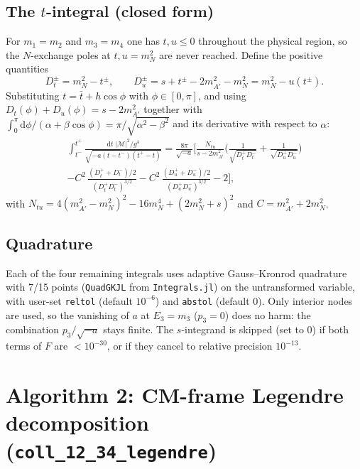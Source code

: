 \documentclass[11pt,a4paper]{article}
\newcommand{\dd}{\mathrm{d}}
\newcommand{\Msq}{|\mathcal{M}|^2}
\newcommand{\code}[1]{\texttt{#1}}
\begin{document}
\subsection{The $t$-integral (closed form)}

For $m_1=m_2$ and $m_3=m_4$ one has $t,u\le0$ throughout the physical region,
so the $N$-exchange poles at $t,u=m_N^2$ are never reached. Define the
positive quantities
\begin{equation}
  D_t^\pm = m_N^2-t^\pm,\qquad D_u^\pm = s+t^\pm-2m_{A'}^2-m_N^2 = m_N^2-u(t^\pm).
\end{equation}
Substituting $t=\bar t+h\cos\phi$ with $\phi\in[0,\pi]$, and using
$D_t(\phi)+D_u(\phi)=s-2m_{A'}^2$ together with
$\int_0^\pi\dd\phi/(\alpha+\beta\cos\phi)=\pi/\sqrt{\alpha^2-\beta^2}$ and its
derivative with respect to $\alpha$:
\begin{multline}
  \int_{t^-}^{t^+}\!\!\frac{\dd t\;\Msq/g^4}{\sqrt{-a(t-t^-)(t^+-t)}}
  = \frac{8\pi}{\sqrt{-a}}\Bigg[
    \frac{N_{tu}}{s-2m_{A'}^2}\Big(\frac{1}{\sqrt{D_t^+D_t^-}}+\frac{1}{\sqrt{D_u^+D_u^-}}\Big)\\
    - C^2\,\frac{(D_t^++D_t^-)/2}{(D_t^+D_t^-)^{3/2}}
    - C^2\,\frac{(D_u^++D_u^-)/2}{(D_u^+D_u^-)^{3/2}}
    - 2\Bigg],
\end{multline}
with $N_{tu}=4(m_{A'}^2-m_N^2)^2-16m_N^4+(2m_N^2+s)^2$ and
$C=m_{A'}^2+2m_N^2$.

\subsection{Quadrature}

Each of the four remaining integrals uses adaptive Gauss--Kronrod quadrature
with 7/15 points (\code{QuadGKJL} from \code{Integrals.jl}) on the
untransformed variable, with
user-set \code{reltol} (default $10^{-6}$) and \code{abstol} (default $0$).
Only interior nodes are used, so the vanishing of $a$ at $E_3=m_3$ ($p_3=0$)
does no harm: the combination $p_3/\sqrt{-a}$ stays finite. The $s$-integrand is
skipped (set to 0) if both terms of $F$ are $<10^{-30}$, or if they cancel to
relative precision $10^{-13}$.

\section{\texorpdfstring{Algorithm 2: CM-frame Legendre decomposition\\ (\code{coll\_12\_34\_legendre})}{Algorithm 2: CM-frame Legendre decomposition}}
\end{document}
